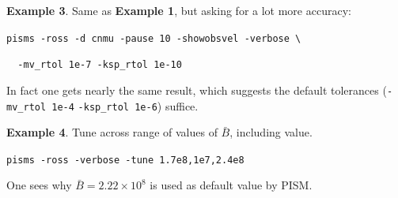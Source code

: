 \documentclass[11pt,final]{amsart}
\begin{document}
\bigskip
\noindent\textbf{Example 3}.  Same as \textbf{Example 1}, but asking for a lot more accuracy:

\verb|pisms -ross -d cnmu -pause 10 -showobsvel -verbose \|

\verb|  -mv_rtol 1e-7 -ksp_rtol 1e-10|

\noindent In fact one gets nearly the same result,  which suggests the default tolerances (\verb|-mv_rtol 1e-4| \verb|-ksp_rtol 1e-6|) suffice.

\bigskip
\noindent\textbf{Example 4}.  Tune across range of values of $\bar B$, including \cite{MacAyealetal}
value.

\verb|pisms -ross -verbose -tune 1.7e8,1e7,2.4e8|

\noindent One sees why $\bar B = 2.22\times 10^8$ is used as default value by PISM.
\end{document}
